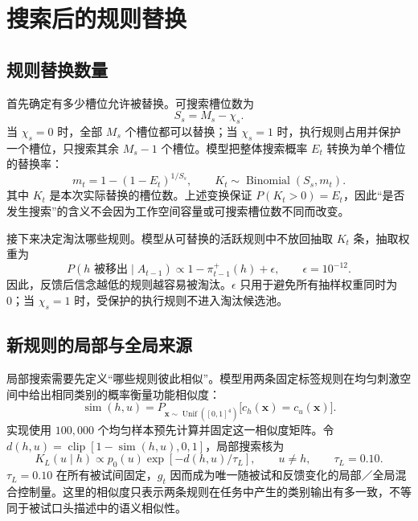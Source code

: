 \documentclass[12pt]{article}
\begin{document}
\section{搜索后的规则替换}

\subsection{规则替换数量}

首先确定有多少槽位允许被替换。可搜索槽位数为
\begin{equation}
S_s=M_s-\chi_s.
\label{eq:searchable-slots}
\end{equation}
当 $\chi_s=0$ 时，全部 $M_s$ 个槽位都可以替换；当 $\chi_s=1$ 时，执行规则占用并保护一个槽位，只搜索其余 $M_s-1$ 个槽位。模型把整体搜索概率 $E_t$ 转换为单个槽位的替换率：
\begin{equation}
m_t=1-(1-E_t)^{1/S_s},
\qquad
K_t\sim\operatorname{Binomial}(S_s,m_t).
\label{eq:replacement-count}
\end{equation}
其中 $K_t$ 是本次实际替换的槽位数。上述变换保证 $P(K_t>0)=E_t$，因此“是否发生搜索”的含义不会因为工作空间容量或可搜索槽位数不同而改变。

接下来决定淘汰哪些规则。模型从可替换的活跃规则中不放回抽取 $K_t$ 条，抽取权重为
\begin{equation}
P(h\text{ 被移出}\mid A_{t-1})
\propto
1-\pi_{t-1}^{+}(h)+\epsilon,
\qquad
\epsilon=10^{-12}.
\label{eq:drop-probability}
\end{equation}
因此，反馈后信念越低的规则越容易被淘汰。$\epsilon$ 只用于避免所有抽样权重同时为 0；当 $\chi_s=1$ 时，受保护的执行规则不进入淘汰候选池。

\subsection{新规则的局部与全局来源}

局部搜索需要先定义“哪些规则彼此相似”。模型用两条固定标签规则在均匀刺激空间中给出相同类别的概率衡量功能相似度：
\begin{equation}
\operatorname{sim}(h,u)
=P_{\bm x\sim\operatorname{Unif}([0,1]^4)}
\bigl[c_h(\bm x)=c_u(\bm x)\bigr].
\label{eq:functional-similarity}
\end{equation}
实现使用 $100{,}000$ 个均匀样本预先计算并固定这一相似度矩阵。令 $d(h,u)=\operatorname{clip}[1-\operatorname{sim}(h,u),0,1]$，局部搜索核为
\begin{equation}
K_L(u\mid h)
\propto
p_0(u)\exp[-d(h,u)/\tau_L],
\qquad
u\neq h,
\qquad
\tau_L=0.10.
\label{eq:local-kernel}
\end{equation}
$\tau_L=0.10$ 在所有被试间固定，$g_t$ 因而成为唯一随被试和反馈变化的局部／全局混合控制量。这里的相似度只表示两条规则在任务中产生的类别输出有多一致，不等同于被试口头描述中的语义相似性。
\end{document}
